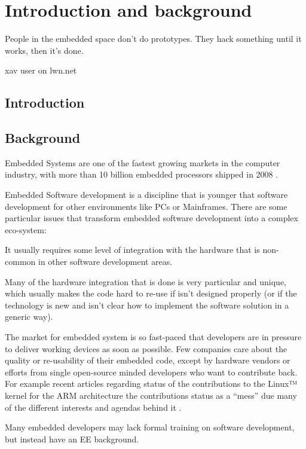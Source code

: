 \chapter{Introduction and background}
\epigraph{People in the embedded space don't do prototypes. They hack something until it works, then it's done.}{xav user on lwn.net}

\section{Introduction}


\section{Background}
Embedded Systems are one of the fastest growing markets in the computer industry, with more than 10 billion embedded processors shipped in 2008 \citep{Clarke:2009uq}.

Embedded Software development is a discipline that is younger that software development for other environments like \acp{PC} or Mainframes. There are some particular issues that transform embedded software development into a complex eco-system:
\begin{itemize*}
\item It usually requires some level of integration with the hardware that is non-common in other software development areas.
\item Many of the hardware integration that is done is very particular and unique, which usually makes the code hard to re-use if isn't designed properly (or if the technology is new and isn't clear how to implement the software solution in a generic way).
\item The market for embedded system is so fast-paced that developers are in pressure to deliver working devices as soon as possible. Few companies care about the quality or re-usability of their embedded code, except by hardware vendors or efforts from single open-source minded developers who want to contribute back. For example recent articles regarding status of the contributions to the Linux™ kernel for the ARM architecture the contributions status as a  ``mess'' due many of the different interests and agendas behind it \cite{Proffitt:2011fk}.
\item Many embedded developers may lack formal training on software development, but instead have an \ac{EE} background.
\end{itemize*}

